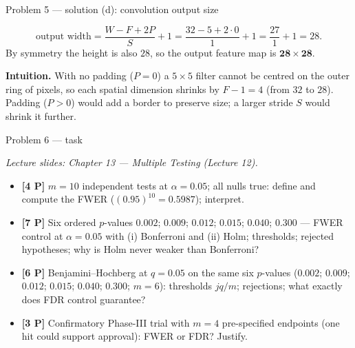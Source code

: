 \documentclass[aspectratio=169,11pt]{beamer}
\begin{document}
\begin{frame}{Problem 5 --- solution (d): convolution output size}
  \begin{solutionbox}
    \[
      \text{output width}=\frac{W-F+2P}{S}+1=\frac{32-5+2\cdot0}{1}+1=\frac{27}{1}+1=28.
    \]
    By symmetry the height is also $28$, so the output feature map is $\mathbf{28\times28}$.
    \medskip

    \textbf{Intuition.} With no padding ($P=0$) a $5\times5$ filter cannot be centred on the outer
    ring of pixels, so each spatial dimension shrinks by $F-1=4$ (from $32$ to $28$). Padding
    ($P>0$) would add a border to preserve size; a larger stride $S$ would shrink it further.
  \end{solutionbox}
\end{frame}

\begin{frame}{Problem 6 --- task}
  \begin{exercise}
    {\scriptsize\itshape Lecture slides: Chapter 13 --- Multiple Testing (Lecture 12).}\par\smallskip
    \begin{itemize}
      \item[(a)] \textbf{[4 P]} $m=10$ independent tests at $\alpha=0.05$; all nulls true:
        define and compute the FWER ($(0.95)^{10}=0.5987$); interpret.
      \item[(b)] \textbf{[7 P]} Six ordered $p$-values
        $0.002$; $0.009$; $0.012$; $0.015$; $0.040$; $0.300$ --- FWER control at $\alpha=0.05$
        with (i) Bonferroni and (ii) Holm; thresholds; rejected hypotheses; why is Holm never
        weaker than Bonferroni?
      \item[(c)] \textbf{[6 P]} Benjamini--Hochberg at $q=0.05$ on the same six $p$-values
        ($0.002$; $0.009$; $0.012$; $0.015$; $0.040$; $0.300$; $m=6$):
        thresholds $jq/m$; rejections; what exactly does FDR control guarantee?
      \item[(d)] \textbf{[3 P]} Confirmatory Phase-III trial with $m=4$ pre-specified endpoints
        (one hit could support approval): FWER or FDR? Justify.
    \end{itemize}
  \end{exercise}
\end{frame}
\end{document}
